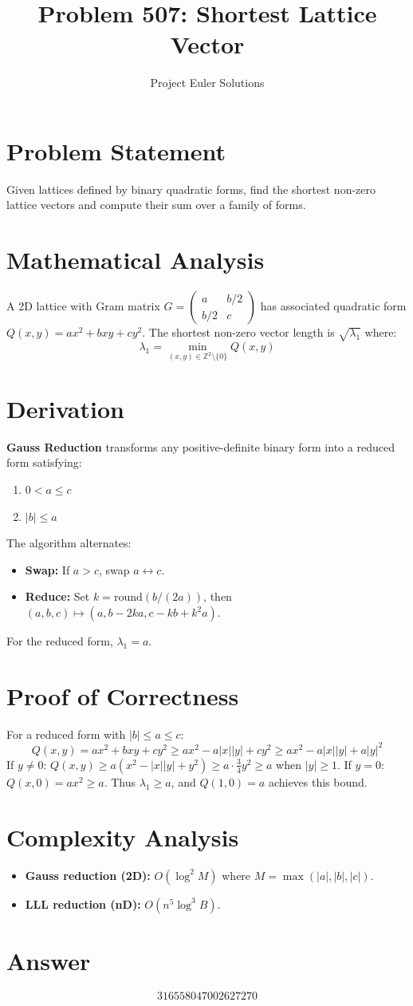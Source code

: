 \documentclass[11pt]{article}
\title{Problem 507: Shortest Lattice Vector}
\author{Project Euler Solutions}
\date{}
\begin{document}
\maketitle

\section{Problem Statement}
Given lattices defined by binary quadratic forms, find the shortest non-zero lattice vectors and compute their sum over a family of forms.

\section{Mathematical Analysis}
A 2D lattice with Gram matrix $G = \begin{pmatrix} a & b/2 \\ b/2 & c \end{pmatrix}$ has associated quadratic form $Q(x,y) = ax^2 + bxy + cy^2$. The shortest non-zero vector length is $\sqrt{\lambda_1}$ where:
\[
\lambda_1 = \min_{(x,y) \in \mathbb{Z}^2 \setminus \{0\}} Q(x,y)
\]

\section{Derivation}
\textbf{Gauss Reduction} transforms any positive-definite binary form into a reduced form satisfying:
\begin{enumerate}
    \item $0 < a \leq c$
    \item $|b| \leq a$
\end{enumerate}

The algorithm alternates:
\begin{itemize}
    \item \textbf{Swap:} If $a > c$, swap $a \leftrightarrow c$.
    \item \textbf{Reduce:} Set $k = \text{round}(b/(2a))$, then $(a, b, c) \mapsto (a, b - 2ka, c - kb + k^2 a)$.
\end{itemize}

For the reduced form, $\lambda_1 = a$.

\section{Proof of Correctness}
For a reduced form with $|b| \leq a \leq c$:
\[
Q(x,y) = ax^2 + bxy + cy^2 \geq ax^2 - a|x||y| + cy^2 \geq ax^2 - a|x||y| + a|y|^2
\]
If $y \neq 0$: $Q(x,y) \geq a(x^2 - |x||y| + y^2) \geq a \cdot \frac{3}{4}y^2 \geq a$ when $|y| \geq 1$.
If $y = 0$: $Q(x,0) = ax^2 \geq a$.
Thus $\lambda_1 \geq a$, and $Q(1,0) = a$ achieves this bound.

\section{Complexity Analysis}
\begin{itemize}
    \item \textbf{Gauss reduction (2D):} $O(\log^2 M)$ where $M = \max(|a|,|b|,|c|)$.
    \item \textbf{LLL reduction (nD):} $O(n^5 \log^3 B)$.
\end{itemize}

\section{Answer}

\[
\boxed{316558047002627270}
\]
\end{document}
